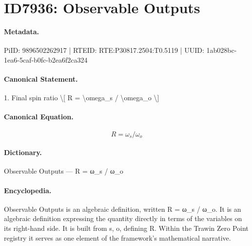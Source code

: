 \section*{ID7936: Observable Outputs}
\paragraph{Metadata.}
PiID: 9896502262917 | RTEID: RTE:P30817.2504:T0.5119 | UUID: 1ab028bc-1ea6-5caf-b0fc-b2ea6f2ca324

\paragraph{Canonical Statement.}
1. Final spin ratio \textbackslash{}[ R = \textbackslash{}omega\_s / \textbackslash{}omega\_o \textbackslash{}]

\paragraph{Canonical Equation.}
\[
R = \omega_s / \omega_o
\]

\paragraph{Dictionary.}
Observable Outputs — R = ω\_s / ω\_o

\paragraph{Encyclopedia.}
Observable Outputs is an algebraic definition, written R = ω\_s / ω\_o. It is an algebraic definition expressing the quantity directly in terms of the variables on its right-hand side. It is built from s, o, defining R. Within the Trawin Zero Point registry it serves as one element of the framework's mathematical narrative.
